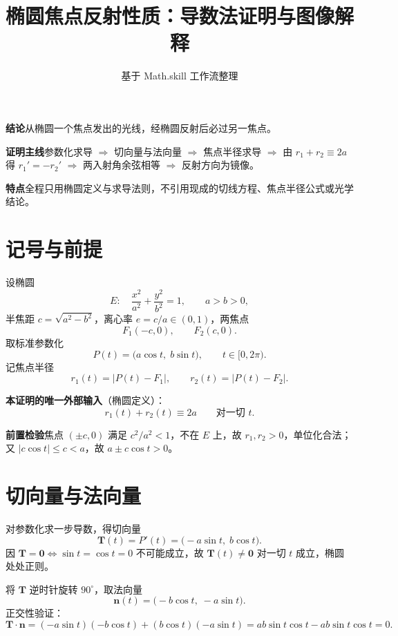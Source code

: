 \documentclass[11pt]{ctexart}
\title{\vspace{-1.2cm}\textbf{椭圆焦点反射性质：导数法证明与图像解释}}
\author{基于 Math.skill 工作流整理}
\date{}
\begin{document}
\maketitle
\vspace{-0.8cm}

\begin{keybox}
\textbf{结论}\quad 从椭圆一个焦点发出的光线，经椭圆反射后必过另一焦点。

\smallskip
\textbf{证明主线}\quad 参数化求导 $\Rightarrow$ 切向量与法向量 $\Rightarrow$ 焦点半径求导
$\Rightarrow$ 由 $r_1+r_2\equiv 2a$ 得 $r_1'=-r_2'$ $\Rightarrow$ 两入射角余弦相等 $\Rightarrow$ 反射方向为镜像。

\smallskip
\textbf{特点}\quad 全程只用椭圆定义与求导法则，不引用现成的切线方程、焦点半径公式或光学结论。
\end{keybox}

\section{记号与前提}

设椭圆
\[
E:\quad \frac{x^{2}}{a^{2}}+\frac{y^{2}}{b^{2}}=1,\qquad a>b>0,
\]
半焦距 $c=\sqrt{a^{2}-b^{2}}$，离心率 $e=c/a\in(0,1)$，两焦点
\[
F_{1}(-c,0),\qquad F_{2}(c,0).
\]
取标准参数化
\[
P(t)=\bigl(a\cos t,\; b\sin t\bigr),\qquad t\in[0,2\pi).
\]
记焦点半径
\[
r_{1}(t)=\bigl|P(t)-F_{1}\bigr|,\qquad r_{2}(t)=\bigl|P(t)-F_{2}\bigr|.
\]

\textbf{本证明的唯一外部输入}（椭圆定义）：
\[
r_{1}(t)+r_{2}(t)\equiv 2a\qquad\text{对一切 } t .
\]

\textbf{前置检验}\quad 焦点 $(\pm c,0)$ 满足 $c^{2}/a^{2}<1$，不在 $E$ 上，故 $r_{1},r_{2}>0$，单位化合法；
又 $|c\cos t|\le c<a$，故 $a\pm c\cos t>0$。

\section{切向量与法向量}

对参数化求一步导数，得切向量
\[
\mathbf{T}(t)=P'(t)=\bigl(-a\sin t,\; b\cos t\bigr).
\]
因 $\mathbf{T}=\mathbf{0}\iff\sin t=\cos t=0$ 不可能成立，故 $\mathbf{T}(t)\neq\mathbf{0}$ 对一切 $t$ 成立，椭圆处处正则。

将 $\mathbf{T}$ 逆时针旋转 $90^{\circ}$，取法向量
\[
\mathbf{n}(t)=\bigl(-b\cos t,\; -a\sin t\bigr).
\]
正交性验证：
\[
\mathbf{T}\cdot\mathbf{n}
=(-a\sin t)(-b\cos t)+(b\cos t)(-a\sin t)=ab\sin t\cos t-ab\sin t\cos t=0 .
\]
\end{document}
